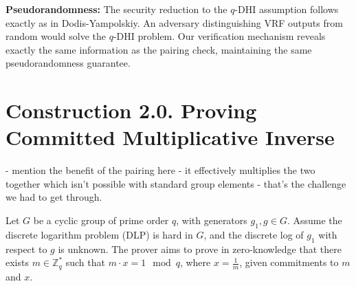 \textbf{Pseudorandomness:} The security reduction to the $q$-DHI assumption follows exactly as in Dodis-Yampolskiy. An adversary distinguishing VRF outputs from random would solve the $q$-DHI problem. Our verification mechanism reveals exactly the same information as the pairing check, maintaining the same pseudorandomness guarantee.




























































\clearpage
\section{Construction 2.0. Proving Committed Multiplicative Inverse}


- mention the benefit of the pairing here - it effectively multiplies the two together which isn't possible with standard group elements - that's the challenge we had to get through.

Let $G$ be a cyclic group of prime order $q$, with generators $g_1, g \in G$. Assume the discrete logarithm problem (DLP) is hard in $G$, and the discrete log of $g_1$ with respect to $g$ is unknown.
The prover aims to prove in zero-knowledge that there exists $m \in \mathbb{Z}_q^*$ such that $m \cdot x = 1 \mod q$, where $x = \frac{1}{m}$, given commitments to $m$ and $x$.

